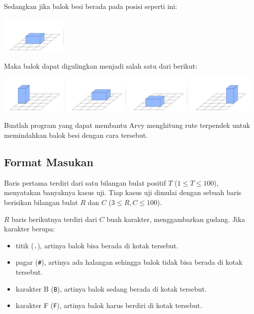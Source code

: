 \documentclass{article}
\begin{document}
Sedangkan jika balok besi berada pada posisi seperti ini:

\begin{center}
    \includegraphics[width=120px]{balok-2-awal}
\end{center}

Maka balok dapat digulingkan menjadi salah satu dari berikut:

\includegraphics[width=120px]{balok-2-kiri}
\includegraphics[width=120px]{balok-2-belakang}
\includegraphics[width=120px]{balok-2-depan}
\includegraphics[width=120px]{balok-2-kanan}

Buatlah program yang dapat membantu Arvy menghitung rute terpendek untuk memindahkan balok besi dengan cara tersebut.

\pagebreak

\subsection*{Format Masukan}
Baris pertama terdiri dari satu bilangan bulat positif $T$ ($1 \leq T \leq 100$), menyatakan banyaknya kasus uji.
Tiap kasus uji dimulai dengan sebuah baris berisikan bilangan bulat $R$ dan $C$ ($3 \leq R, C \leq 100$).

$R$ baris berikutnya terdiri dari $C$ buah karakter, menggambarkan gudang. Jika karakter berupa:
\begin{itemize}
    \setlength\itemsep{0pt}
    \item titik (\lstinline{.}), artinya balok bisa berada di kotak tersebut.
    \item pagar (\lstinline{#}), artinya ada halangan sehingga balok tidak bisa berada di kotak tersebut.
    \item karakter B (\lstinline{B}), artinya balok sedang berada di kotak tersebut.
    \item karakter F (\lstinline{F}), artinya balok harus berdiri di kotak tersebut.
\end{itemize}
\end{document}
